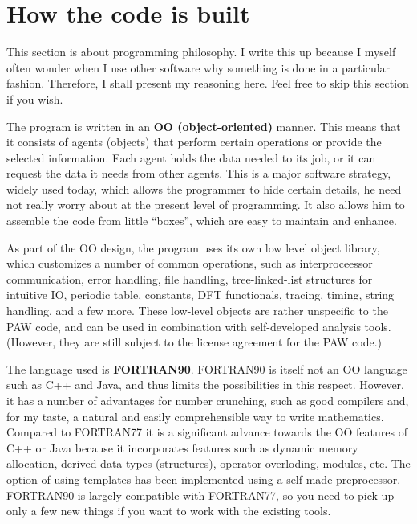 \documentclass[final,12pt]{article}
\begin{document}
\section{How the code is built}

This section is about programming philosophy.  I write this up because
I myself often wonder when I use other software why something is done
in a particular fashion. Therefore, I shall present my reasoning here.
Feel free to skip this section if you wish.

The program is written in an {\bf OO (object-oriented)} manner. This
means that it consists of agents (objects) that perform certain
operations or provide the selected information. Each agent holds the
data needed to its job, or it can request the data it needs from other
agents. This is a major software strategy, widely used today, which
allows the programmer to hide certain details, he need not really worry about
at the present level of programming. It also allows him to assemble the
code from little ``boxes'', which are easy to maintain and enhance.

As part of the OO design, the program uses its own low level object
library, which customizes a number of common operations, such as
interproceessor communication, error handling, file handling,
tree-linked-list structures for intuitive IO, periodic table,
constants, DFT functionals, tracing, timing, string handling, and a
few more. These low-level objects are rather unspecific to the PAW
code, and can be used in combination with self-developed analysis
tools. (However, they are still subject to the license agreement for
the PAW code.)

The language used is {\bf FORTRAN90}. FORTRAN90 is itself not an OO
language such as C++ and Java, and thus limits the possibilities in
this respect. However, it has a number of advantages for number
crunching, such as good compilers and, for my taste, a natural and
easily comprehensible way to write mathematics. Compared to FORTRAN77
it is a significant advance towards the OO features of C++ or Java
because it incorporates features such as dynamic memory allocation,
derived data types (structures), operator overloding, modules, etc.
The option of using templates has been implemented using a self-made
preprocessor.  FORTRAN90 is largely compatible with FORTRAN77, so you
need to pick up only a few new things if you want to work with the
existing tools.
\end{document}
